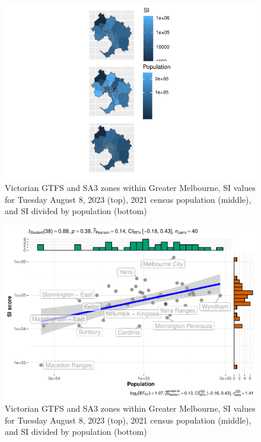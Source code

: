 \documentclass[preprint, 3p,
authoryear]{elsarticle} %
\begin{document}
\begin{figure}
\centering
\includegraphics{Leveraging_GTFS_to_assess_transit_supply_Transport_Geography_files/figure-latex/map_greater_melbourne_230808_by_sa3-1.pdf}
\caption{Victorian GTFS and SA3 zones within Greater Melbourne, SI
values for Tuesday August 8, 2023 (top), 2021 census population
(middle), and SI divided by population (bottom)}
\end{figure}

\begin{figure}
\centering
\includegraphics{Leveraging_GTFS_to_assess_transit_supply_Transport_Geography_files/figure-latex/greater_melbourne_230808_by_sa3_scatterplot-1.pdf}
\caption{Victorian GTFS and SA3 zones within Greater Melbourne, SI
values for Tuesday August 8, 2023 (top), 2021 census population
(middle), and SI divided by population (bottom)}
\end{figure}
\end{document}
